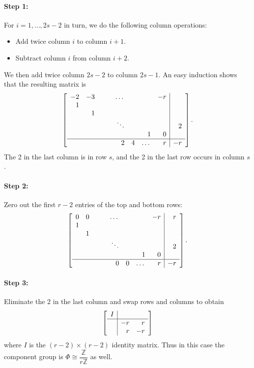 \documentclass[reqno]{amsart}
\theoremstyle{definition}
\theoremstyle{remark}
\def\Z{\mathbb{Z}}
\def\isom{\cong}
\begin{document}
\paragraph{Step 1:}
\label{sec:step-1-even}

For $i = 1, \dots, 2s-2$ in turn, we do the following column operations:
\begin{itemize}
    \item Add twice column $i$ to column $i+1$.
    \item Subtract column $i$ from column $i+2$.
\end{itemize}
We then add twice column $2s-2$ to column $2s-1$. An easy induction shows that the resulting matrix is
\[
\left[\begin{array}{rrrrrrrr|r}
  -2 & -3 & & & \dots & & & -r & \\
  1 & & & & & & & & \\
  & 1 & & & & & & & \\
  & & & & \ddots & & & & 2 \\
  & & & & & & 1 & 0 & \\ \hline
  & & & & 2 & 4 & \dots & r & -r
\end{array}\right].
\]
The 2 in the last column is in row $s$, and the 2 in the last row occurs in column $s$.

\paragraph{Step 2:}
\label{sec:step-2-even}

Zero out the first $r-2$ entries of the top and bottom rows:
\[
\left[\begin{array}{rrrrrrrr|r}
  0 & 0 & & & \dots & & & -r & r \\
  1 & & & & & & & & \\
  & 1 & & & & & & & \\
  & & & & \ddots & & & & 2 \\
  & & & & & & 1 & 0 & \\ \hline
  & & & & 0 & 0 & \dots & r & -r
\end{array}\right].
\]

\paragraph{Step 3:}
\label{sec:step-3-even}

Eliminate the 2 in the last column and swap rows and columns to obtain
\[
\left[\begin{array}{c|rr}
  I & & \\ \hline
 & -r & r \\
& r & -r
\end{array}\right]
\]
where $I$ is the $(r-2) \times (r-2)$ identity matrix. Thus in this case the component group is $\Phi \isom \dfrac{\Z}{r\Z}$ as well.
\end{document}
